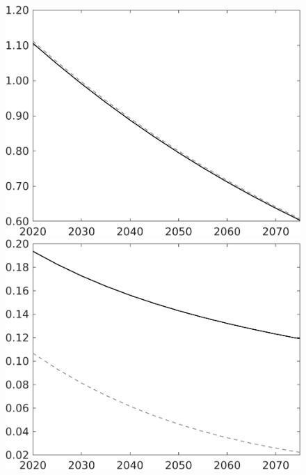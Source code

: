 \documentclass[12pt]{article}
\begin{document}
\begin{figure}[h!!]
\begin{minipage}[]{0.32\textwidth}
	\end{minipage}	
	\begin{minipage}[]{0.32\textwidth}
		\includegraphics[width=1\textwidth]{../../codding_model/own_basedOnFried/optimalPol_010922_revision/figures/all_13Sept22/LevTaufNoTauf_TaulCalib_regime0_pg_spillover0_nsk1_xgr1_knspil1_sep1_LFlimit0_emsbase0_countec0_GovRev0_etaa0.79_lgd0.png}
	\end{minipage}	
	\begin{minipage}[]{0.32\textwidth}
		\includegraphics[width=1\textwidth]{../../codding_model/own_basedOnFried/optimalPol_010922_revision/figures/all_13Sept22/LevTaufNoTauf_TaulCalib_regime0_pee_spillover0_nsk1_xgr1_knspil1_sep1_LFlimit0_emsbase0_countec0_GovRev0_etaa0.79_lgd0.png}

\end{minipage}
\end{figure}
\end{document}
